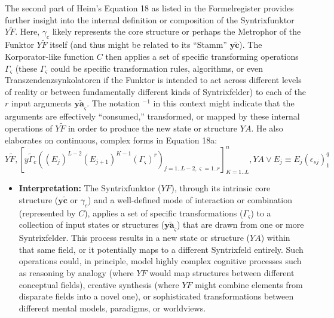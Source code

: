 \documentclass[12pt]{article}
\newcommand{\q}[1]{\enquote{#1}}
\newcommand{\syntrix}{\bm{y\widetilde{a}}}
\newcommand{\syntrixfunktor}{YF}
\begin{document}
\begin{itemize}
    The second part of Heim's Equation 18 as listed in the Formelregister provides further insight into the internal definition or composition of the Syntrixfunktor \( Y\tilde{F} \). Here, \( \gamma_c \) likely represents the core structure or perhaps the Metrophor of the Funktor \( Y\tilde{F} \) itself (and thus might be related to its \q{Stamm} \( \mathbf{y\widetilde{c}} \)). The Korporator-like function \( C \) then applies a set of specific transforming operations \( \Gamma_\varsigma \) (these \( \Gamma_\varsigma \) could be specific transformation rules, algorithms, or even Transzendenzsynkolatoren if the Funktor is intended to act across different levels of reality or between fundamentally different kinds of Syntrixfelder) to each of the \( r \) input arguments \( \syntrix_\varsigma \). The notation \( {}^{-1} \) in this context might indicate that the arguments are effectively \q{consumed,} transformed, or mapped by these internal operations of \( Y\tilde{F} \) in order to produce the new state or structure \( YA \). He also elaborates on continuous, complex forms in Equation 18a:
    \begin{equation}
    Y\tilde{F}, [y\tilde{\Gamma}_c ( (E_j)^{L-2} (E_{j+1})^{K-1} (\Gamma_\varsigma)^{r} )_{j=1..L-2, \varsigma=1..r} ]^n_{K=1..L}, YA \vee E_j \equiv E_j(\epsilon_{sj})^q_1
    \label{eq:original_continuous_syntrixfunktor}
    \end{equation}
    \begin{itemize}
        \item \textbf{Interpretation:} The Syntrixfunktor (\(\syntrixfunktor\)), through its intrinsic core structure (\( \mathbf{y\widetilde{c}} \) or \( \gamma_c \)) and a well-defined mode of interaction or combination (represented by \( C \)), applies a set of specific transformations (\( \Gamma_\varsigma \)) to a collection of input states or structures (\( \syntrix_\varsigma \)) that are drawn from one or more Syntrixfelder. This process results in a new state or structure (\( YA \)) within that same field, or it potentially maps to a different Syntrixfeld entirely. Such operations could, in principle, model highly complex cognitive processes such as reasoning by analogy (where \( \syntrixfunktor \) would map structures between different conceptual fields), creative synthesis (where \( \syntrixfunktor \) might combine elements from disparate fields into a novel one), or sophisticated transformations between different mental models, paradigms, or worldviews.
    \end{itemize}


\end{itemize}
\end{document}
